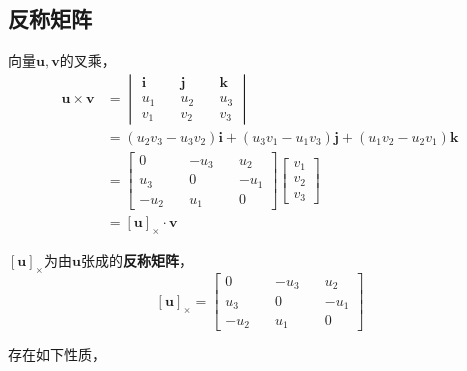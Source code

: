 \subsection{反称矩阵}
 	向量$\mathbf{u},\mathbf{v}$的叉乘，
 	\begin{align*}
 		\mathbf{u}\times \mathbf{v} &= 
 		\begin{vmatrix}
 			\mathbf{i}\quad & \mathbf{j}\quad & \mathbf{k}\\
 			u_1\quad& u_2\quad& u_3\\
 			v_1\quad& v_2\quad& v_3
 		\end{vmatrix}\\
 		&= (u_2v_3 -u_3v_2)\mathbf{i} + (u_3v_1 - u_1v_3)\mathbf{j} +(u_1v_2 - u_2v_1)\mathbf{k}\\
 		&=\begin{bmatrix}
 			0 \quad& -u_3\quad & u_2\\
 			u_3\quad & 0\quad& -u_1\\
 			-u_2\quad& u_1\quad& 0
 		\end{bmatrix}
 		\begin{bmatrix}
 			v_1\\
 			v_2\\
 			v_3
 		\end{bmatrix}
 		\\
 		&= [\mathbf{u}]_{\times} \cdot \mathbf{v}
 	\end{align*}

 	$[\mathbf{u}]_{\times}$为由$\mathbf{u}$张成的\textbf{反称矩阵}，
 	$$
 		[\mathbf{u}]_{\times} = 
 		\begin{bmatrix}
 			0 \quad& -u_3\quad & u_2\\
 			u_3\quad & 0\quad& -u_1\\
 			-u_2\quad& u_1\quad& 0
 		\end{bmatrix}
 	$$

	存在如下性质，

